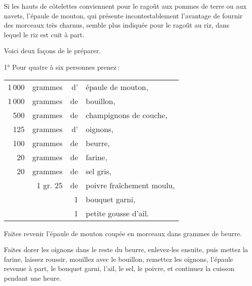 Si les hauts de côtelettes conviennent pour le ragoût aux pommes de terre ou
aux navets, l'épaule de mouton, qui présente incontestablement l'avantage de
fournir des morceaux très charnus, semble plus indiquée pour le ragoût au riz,
dans lequel le riz est cuit à part.

\medskip

Voici deux façons de le préparer.

\medskip

1° Pour quatre à six personnes prenez :

\footnotesize
\begin{longtable}{rrrp{16em}}
  1 000 & grammes  & d' & épaule de mouton,                                                               \\
  1 000 & grammes  & de & bouillon,                                                                       \\
    500 & grammes  & de & champignons de couche,                                                          \\
    125 & grammes  & d' & oignons,                                                                        \\
    100 & grammes  & de & beurre,                                                                         \\
     20 & grammes  & de & farine,                                                                         \\
     20 & grammes  & de & sel gris,                                                                       \\
        & 1 gr. 25 & de & poivre fraîchement moulu,                                                       \\
        &          &  1 & bouquet garni,                                                                  \\
        &          &  1 & petite gousse d'ail.                                                            \\
\end{longtable}
\normalsize

Faites revenir l'épaule de mouton coupée en morceaux dans {\mmm} grammes
de beurre.

Faites dorer les oignons dans le reste du beurre, enlevez-les ensuite, puis
mettez la farine, laissez roussir, mouillez avec le bouillon, remettez les
oignons, l'épaule revenue à part, le bouquet garni, l'ail, le sel, le poivre,
et continuez la cuisson pendant une heure.

